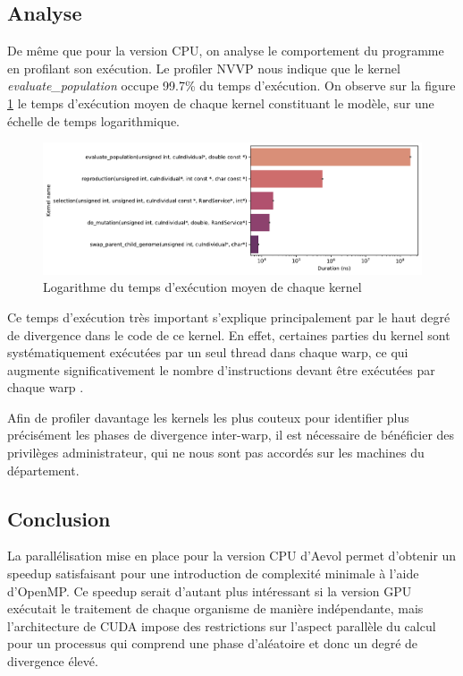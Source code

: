 \documentclass[a4paper, 10pt, twoside]{article}
\begin{document}
\subsection{Analyse}

De même que pour la version CPU, on analyse le comportement du programme en profilant son exécution. Le profiler NVVP nous indique que le kernel \textit{evaluate\_population} occupe 99.7\% du temps d'exécution. On observe sur la figure \ref{fig:kernel/timings} le temps d'exécution moyen de chaque kernel constituant le modèle, sur une échelle de temps logarithmique.

\begin{figure}[htp]
	\centering
	\includegraphics[width=0.7\linewidth]{img/kernel_timings.pdf}
	\caption{Logarithme du temps d'exécution moyen de chaque kernel}
	\label{fig:kernel/timings}
\end{figure}

Ce temps d'exécution très important s'explique principalement par le haut degré de divergence dans le code de ce kernel. En effet, certaines parties du kernel sont systématiquement exécutées par un seul thread dans chaque warp, ce qui augmente significativement le nombre d'instructions devant être exécutées par chaque warp \cite{nvidia/branching}.

Afin de profiler davantage les kernels les plus couteux pour identifier plus précisément les phases de divergence inter-warp, il est nécessaire de bénéficier des privilèges administrateur, qui ne nous sont pas accordés sur les machines du département.

\subsection{Conclusion}

La parallélisation mise en place pour la version CPU d'Aevol permet d'obtenir un speedup satisfaisant pour une introduction de complexité minimale à l'aide d'OpenMP. Ce speedup serait d'autant plus intéressant si la version GPU exécutait le traitement de chaque organisme de manière indépendante, mais l'architecture de CUDA impose des restrictions sur l'aspect parallèle du calcul pour un processus qui comprend une phase d'aléatoire et donc un degré de divergence élevé.



\end{document}

